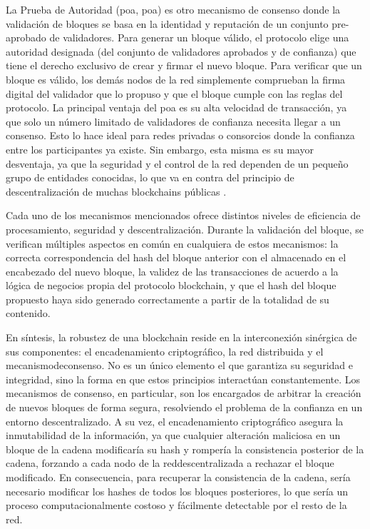 La Prueba de Autoridad (\acrshort{poa}, \acrlong{poa}) es otro mecanismo de consenso donde la validación de bloques se basa en la identidad y reputación de un conjunto pre-aprobado de validadores. Para generar un bloque válido, el protocolo elige una autoridad designada (del conjunto de validadores aprobados y de confianza) que tiene el derecho exclusivo de crear y firmar el nuevo bloque. Para verificar que un bloque es válido, los demás nodos de la red simplemente comprueban la firma digital del validador que lo propuso y que el bloque cumple con las reglas del protocolo. La principal ventaja del \acrshort{poa} es su alta velocidad de transacción, ya que solo un número limitado de validadores de confianza necesita llegar a un consenso. Esto lo hace ideal para redes privadas o consorcios donde la confianza entre los participantes ya existe. Sin embargo, esta misma es su mayor desventaja, ya que la seguridad y el control de la red dependen de un pequeño grupo de entidades conocidas, lo que va en contra del principio de descentralización de muchas blockchains públicas \cite{diaz2022protocolos}.

Cada uno de los mecanismos mencionados ofrece distintos niveles de eficiencia de procesamiento, seguridad y descentralización. Durante la validación del bloque, se verifican múltiples aspectos en común en cualquiera de estos mecanismos: la correcta correspondencia del hash del bloque anterior con el almacenado en el encabezado del nuevo bloque, la validez de las transacciones de acuerdo a la lógica de negocios propia del protocolo blockchain, y que el hash del bloque propuesto haya sido generado correctamente a partir de la totalidad de su contenido.

En síntesis, la robustez de una blockchain reside en la interconexión sinérgica de sus componentes: el encadenamiento criptográfico, la red distribuida y el \gls{mecanismodeconsenso}. No es un único elemento el que garantiza su seguridad e integridad, sino la forma en que estos principios interactúan constantemente. Los mecanismos de consenso, en particular, son los encargados de arbitrar la creación de nuevos bloques de forma segura, resolviendo el problema de la confianza en un entorno descentralizado. A su vez, el encadenamiento criptográfico asegura la inmutabilidad de la información, ya que cualquier alteración maliciosa en un bloque de la cadena modificaría su hash y rompería la consistencia posterior de la cadena, forzando a cada nodo de la \gls{reddescentralizada} a rechazar el bloque modificado. En consecuencia, para recuperar la consistencia de la cadena, sería necesario modificar los hashes de todos los bloques posteriores, lo que sería un proceso computacionalmente costoso y fácilmente detectable por el resto de la red. 

